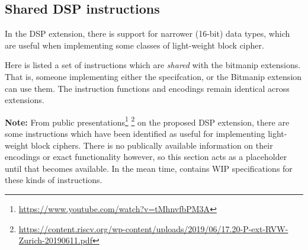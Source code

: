 
\subsection{Shared DSP instructions}
\label{sec:spec:shared:dsp}

In the DSP extension, there is support for narrower (16-bit)
data types, which are useful when implementing some classes of
light-weight block cipher.

Here is listed a set of instructions which are {\em shared} with
the bitmanip extensions.
That is, someone implementing either the \XCID specifcation, or
the Bitmanip extension can use them.
The instruction functions and encodings remain identical across extensions.


{\bf Note:} From public presentations\footnote{
\url{https://www.youtube.com/watch?v=tMhnvfbPM3A}
}
\footnote{
\url{https://content.riscv.org/wp-content/uploads/2019/06/17.20-P-ext-RVW-Zurich-20190611.pdf}
}
on the proposed DSP
extension, there are some instructions which have been identified as
useful for implementing light-weight block ciphers.
There is no publically available information on their encodings
or exact functionality however, so this section acts as a placeholder
until that becomes available.
In the mean time,
contains WIP specifications for these kinds of instructions.
